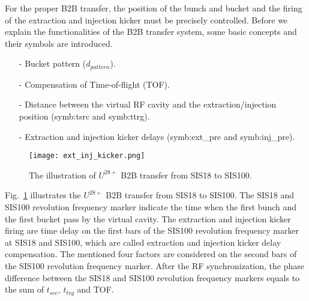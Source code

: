 For the proper B2B transfer, the position of the bunch and bucket and the firing of the extraction and injection kicker must be precisely controlled. Before we explain the functionalities of the B2B transfer system, some basic concepts and their symbols are introduced.

\begin{itemize}
\item[-] Bucket pattern ($d_{pattern}$).
\item[-] Compensation of Time-of-flight (\gls{TOF}). 
\item[-] Distance between the virtual RF cavity and the extraction/injection position  (\gls{symb:tsrc} and \gls{symb:ttrg}). 
\item[-] Extraction and injection kicker delays (\gls{symb:ext_pre} and \gls{symb:inj_pre}).
\end{itemize}
\begin{figure}[!htb]
   \centering   
   \texttt{[image: ext\_inj\_kicker.png]}
   \caption{The illustration of $U^{28+}$ B2B transfer from SIS18 to SIS100.}
   \label{ext_inj_kicker}
\end{figure}
Fig.~\ref{ext_inj_kicker} illustrates the $U^{28+}$ B2B transfer from SIS18 to SIS100. The SIS18 and SIS100 revolution frequency marker indicate the time when the first bunch and the first bucket pass by the virtual cavity. The extraction and injection kicker firing are time delay on the first bars of the SIS100 revolution frequency marker at SIS18 and SIS100, which are called extraction and injection kicker delay compensation. The mentioned four factors are considered on the second bars of the SIS100 revolution frequency marker. After the RF synchronization, the phase difference between the SIS18 and SIS100 revolution frequency markers equals to the sum of $t_{src}$, $t_{trg}$ and TOF.   
